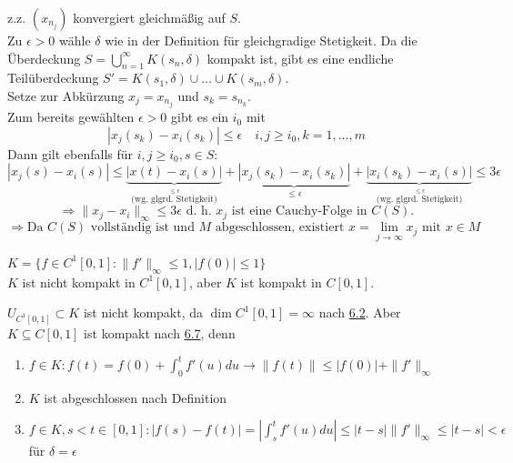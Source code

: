 \begin{beweis}
	z.z. $(x_{n_{j}})$ konvergiert gleichmä{\ss}ig auf $S$. \\
	Zu $\epsilon > 0$ wähle $\delta$ wie in der Definition für gleichgradige Stetigkeit.
	Da die Überdeckung $S = \bigcup_{n = 1}^{\infty} K(s_{n}, \delta)$ kompakt ist, gibt es eine endliche Teilüberdeckung $S' = K(s_1, \delta) \cup \dotsc \cup K(s_{m}, \delta)$. \\
	Setze zur Abkürzung $x_{j} = x_{n_{j}}$ und $s_{k} = s_{n_{k}}$. \\
	Zum bereits gewählten $\epsilon > 0$ gibt es ein $i_{0}$ mit 
	\[ | x_{j}(s_{k}) - x_{i}(s_{k}) | \leq \epsilon \quad i, j \geq i_{0}, k = 1, \dotsc, m \]
	Dann gilt ebenfalls für $i, j \geq i_{0}, s \in S$: \\
	\[ | x_{j}(s) - x_{i}(s) | \leq \underbrace{| x(t) - x_{i}(s) |}_{\overset{\leq \epsilon}{\text{(wg. glgrd. Stetigkeit)}}} + \underbrace{| x_{j}(s_{k}) - x_{i}(s_{k}) |}_{\leq \epsilon} + \underbrace{| x_{i}(s_{k}) - x_{i}(s) |}_{\overset{\leq \epsilon}{\text{(wg. glgrd. Stetigkeit)}}} \leq 3 \epsilon \]
	\[ \Rightarrow \| x_{j} - x_{i}\|_{\infty} \leq 3 \epsilon \text{ d. h. } x_{j} \text{ ist eine Cauchy-Folge in } C(S). \]
	\[ \Rightarrow \text{Da } C(S) \text{ vollständig ist und } M \text{ abgeschlossen, existiert } x = \lim_{j \rightarrow \infty} x_{j} \text{ mit } x \in M \]
\end{beweis}


\begin{beispiel}
	$K = \{ f \in C^{1}[0, 1]: \| f' \|_{\infty} \leq 1, | f(0) | \leq 1 \}$ \\
	$K$ ist nicht kompakt in $C^{1}[0, 1]$, aber $K$ ist kompakt in $C[0, 1]$.	
\end{beispiel}

\begin{beweis}
	$U_{C^{1}[0, 1]} \subset K$ ist nicht kompakt, da $\dim C^{1}[0, 1] = \infty$ nach \hyperref[satz:6.2]{6.2}. Aber $K \subseteq C[0, 1]$ ist kompakt nach \hyperref[satz:6.7-ArzelaAscoli]{6.7}, denn 
	\begin{enumerate}[label=\alph*\upshape)]
		\item $f \in K: f(t) = f(0) + \int_{0}^{t} f'(u) du \rightarrow \|f(t)\| \leq |f(0)| + \| f' \|_{\infty}$
		\item $K$ ist abgeschlossen nach Definition
		\item $f \in K, s < t \in [0, 1]: |f(s) - f(t)| = | \int_{s}^{t} f'(u) du | \leq |t-s| \|f'\|_{\infty} \leq | t - s| < \epsilon$ für $\delta = \epsilon$
	\end{enumerate}
\end{beweis}


